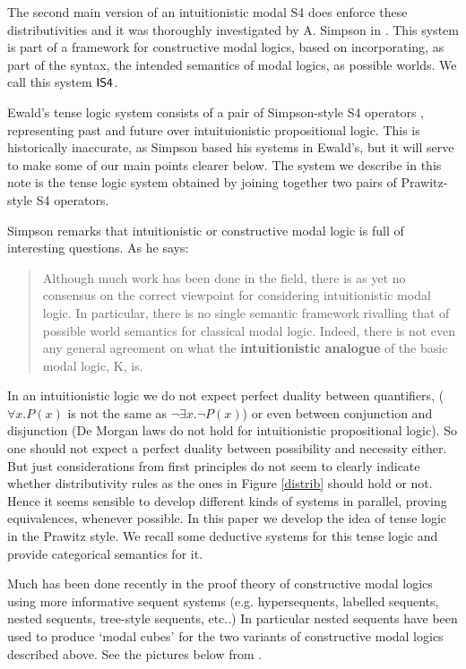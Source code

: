 \documentclass{article}
\begin{document}
The second main version of an intuitionistic modal S4 does enforce these distributivities and it was thoroughly investigated by A. Simpson in \cite{simpson1994}. This system is part of a framework for constructive modal logics, based on incorporating, as part of the syntax, the intended semantics of modal logics, as possible worlds. We call this system $\sf IS4$. 

Ewald's tense logic system consists of a pair of Simpson-style S4 operators \cite{simpson1994},
representing past and future over intuituionistic propositional logic. This is historically inaccurate, as Simpson based his systems in Ewald's, but it will serve to make some of our main points clearer below. The system we describe in this note is the tense logic system obtained by joining together two pairs of Prawitz-style S4 operators. 

Simpson remarks that intuitionistic or constructive modal logic is full of interesting questions. As he says:
\begin{quote}
Although much work has been done in the field, there is as yet no consensus on the correct viewpoint for considering intuitionistic modal logic.  In particular, there is no single semantic framework rivalling that of possible world semantics for classical modal logic. Indeed, there is not even any general agreement on what the \textbf{intuitionistic analogue} of the basic modal logic, K, is.
\end{quote}
In an intuitionistic logic we do not expect perfect duality between quantifiers, ($\forall x.P(x)$ is not the same as $\neg \exists x.\neg
P(x)$) or even between conjunction and disjunction (De Morgan laws do not hold for intuitionistic propositional logic). So one should not expect a perfect duality between possibility and necessity either. But just considerations from first principles do not seem to clearly indicate whether distributivity rules as the ones in Figure \ref{distrib} should hold or not. Hence it seems sensible to develop different kinds of systems in parallel, proving equivalences, whenever possible. In this paper we develop the idea of tense logic in the Prawitz style. We recall some deductive systems for this tense logic and provide categorical semantics for it.


Much has been done recently in the proof theory of constructive modal logics using more informative sequent systems (e.g. hypersequents, labelled sequents, nested sequents, tree-style sequents, etc..) In particular nested sequents have been used to produce `modal cubes' for the two variants of constructive modal logics described above. See the pictures below from \cite{arisaka2015,strasburger2013}.
\end{document}
